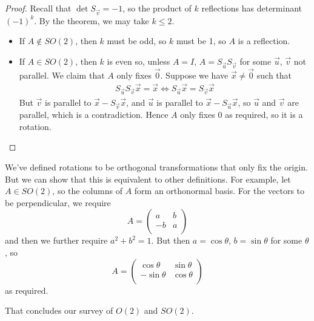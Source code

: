 \documentclass{../template/note}
\begin{document}
    \begin{proof}
        Recall that \(\det S_{\vec v} = -1\), so the product of \(k\) reflections has determinant \((-1)^k\). By the theorem, we may take \(k \leq 2\).
        \begin{itemize}
            \item If \(A \notin SO(2)\), then \(k\) must be odd, so \(k\) must be 1, so \(A\) is a reflection.
            \item If \(A \in SO(2)\), then \(k\) is even so, unless \(A = I\), \(A = S_{\vec u}S_{\vec v}\) for some \(\vec u\), \(\vec v\) not parallel. We claim that \(A\) only fixes \(\vec 0\). Suppose we have \(\vec x \neq \vec 0\) such that
            \begin{align*}
                S_{\vec u}S_{\vec v}\vec x = \vec x \iff S_{\vec u} \vec x = S_{\vec v} \vec x
            \end{align*}
            But \(\vec v\) is parallel to \(\vec x - S_{\vec v} \vec x\), and \(\vec u\) is parallel to \(\vec x - S_{\vec u} \vec x\), so \(\vec u\) and \(\vec v\) are parallel, which is a contradiction. Hence \(A\) only fixes 0 as required, so it is a rotation.            
        \end{itemize}
    \end{proof}
    
    \begin{remark*}
        We've defined rotations to be orthogonal transformations that only fix the origin. But we can show that this is equivalent to other definitions. For example, let \(A \in SO(2)\), so the columns of \(A\) form an orthonormal basis. For the vectors to be perpendicular, we require
        \[
            A = \begin{pmatrix}
             a & b \\
             -b & a \\
            \end{pmatrix}
        \]
        and then we further require \(a^2 + b^2 = 1\). But then \(a = \cos \theta\), \(b = \sin \theta\) for some \(\theta\), so
        \[
            A = \begin{pmatrix}
             \cos \theta & \sin \theta \\
             -\sin \theta & \cos \theta \\
            \end{pmatrix}
        \]
        as required.
    \end{remark*}

    That concludes our survey of \(O(2)\) and \(SO(2)\).
    
\end{document}

